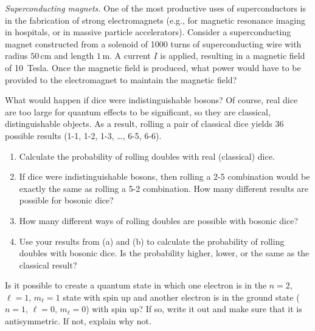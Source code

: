 \begin{problem} 
  {\em Superconducting magnets.}  One of the most productive uses of
  superconductors is in the fabrication of strong electromagnets
  (e.g., for magnetic resonance imaging in hospitals, or in massive
  particle accelerators).  Consider a superconducting magnet
  constructed from a solenoid of 1000 turns of superconducting wire
  with radius $50\, \mbox{cm}$ and length $1\, \mbox{m}$.  A current
  $I$ is applied, resulting in a magnetic field of 10~Tesla.  Once the
  magnetic field is produced, what power would have to be provided to
  the electromagnet to maintain the magnetic field?
\label{prob:superconducting_magnets}
\end{problem}


\begin{problem}
  What would happen if dice were indistinguishable bosons?  Of course,
  real dice are too large for quantum effects to be significant, so
  they are classical, distinguishable objects.  As a result, rolling a
  pair of classical dice yields 36 possible results (1-1, 1-2, 1-3,
  \dots, 6-5, 6-6).
  \begin{enumerate}
  \item Calculate the probability of rolling doubles with real
    (classical) dice.
  \item If dice were indistinguishable bosons, then rolling a 2-5
    combination would be exactly the same as rolling a 5-2
    combination.  How many different results are possible for bosonic
    dice?
  \item How many different ways of rolling doubles are possible with
    bosonic dice?
  \item Use your results from (a) and (b) to calculate the probability
    of rolling doubles with bosonic dice.  Is the probability higher,
    lower, or the same as the classical result?
  \end{enumerate}
\end{problem}



\begin{problem}
  Is it possible to create a quantum state in which one electron is in
  the $n=2$, $\ell=1$, $m_\ell=1$ state with spin up and another
  electron is in the ground state ($n=1$, $\ell=0$, $m_\ell=0$) with
  spin up?  If so, write it out and make sure that it is
  antisymmetric.  If not, explain why not.
\end{problem}


